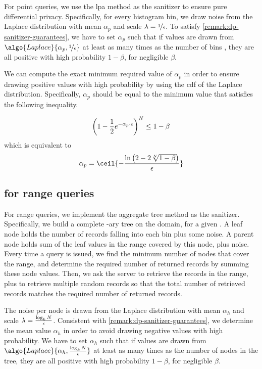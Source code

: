 		For point queries, we use the \acrshort{lpa} method as the sanitizer to ensure pure differential privacy.
		Specifically, for every histogram bin, we draw noise from the Laplace distribution with mean $\alpha_p$ and scale $\lambda = \nicefrac{1}{\epsilon}$.
		To satisfy \cref{remark:dp-sanitizer-guarantees}, we have to set $\alpha_p$ such that if values are drawn from $\algo{Laplace}{ \alpha_p, \nicefrac{1}{\epsilon} }$ at least as many times as the number of bins \domainSize{}, they are all positive with high probability $1 - \beta$, for negligible $\beta$.

		We can compute the exact minimum required value of $\alpha_p$ in order to ensure drawing positive values with high probability by using the \acrshort{cdf} of the Laplace distribution.
		Specifically, $\alpha_p$ should be equal to the minimum value that satisfies the following inequality.

		\[
			\left( 1 - \frac{1}{2} e^{- \alpha_p \cdot \epsilon} \right)^{N} \leq 1 - \beta
		\]
		which is equivalent to
		\[
			\alpha_p = \ceil{ -\frac{ \ln \left( 2 - 2 \sqrt[\domainSize]{1 - \beta} \right) }{ \epsilon } }
		\]

	

	\subsection{\texorpdfstring{\epsolute{}}{Epsolute} for range queries}\label{section:range-persistent:dp-oram:range}

		For range queries, we implement the aggregate tree method as the sanitizer.
		Specifically, we build a complete \fanout{}-ary tree on the domain, for a given \fanout{}.
		A leaf node holds the number of records falling into each bin plus some noise.
		A parent node holds sum of the leaf values in the range covered by this node, plus noise.
		Every time a query is issued, we find the minimum number of nodes that cover the range, and determine the required number of returned records by summing these node values.
		Then, we ask the server to retrieve the records in the range, plus to retrieve multiple random records so that the total number of retrieved records matches the required number of returned records.

		The noise per node is drawn from the Laplace distribution with mean $\alpha_h$ and scale $\lambda = \frac{\log_{k} N}{\epsilon}$.
		Consistent with \cref{remark:dp-sanitizer-guarantees}, we determine the mean value $\alpha_h$ in order to avoid drawing negative values with high probability.
		We have to set $\alpha_h$ such that if values are drawn from $\algo{Laplace}{ \alpha_h, \frac{\log_{\fanout} \domainSize}{\epsilon} }$ at least as many times as the number of nodes in the tree, they are all positive with high probability $1 - \beta$, for negligible $\beta$.

